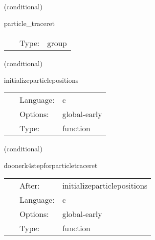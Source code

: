 \vspace{5mm}

   (conditional) 

\hspace{5mm} particle\_traceret 

\hspace{5mm}{\it particle traceret subroutines } 


\hspace{5mm}

 \begin{tabular*}{160mm}{cll} 
~ & Type:  & group \\ 
\end{tabular*} 


\vspace{5mm}

   (conditional) 

\hspace{5mm} initializeparticlepositions 

\hspace{5mm}{\it initialize particle positions } 


\hspace{5mm}

 \begin{tabular*}{160mm}{cll} 
~ & Language:  & c \\ 
~ & Options:  & global-early \\ 
~ & Type:  & function \\ 
\end{tabular*} 


\vspace{5mm}

   (conditional) 

\hspace{5mm} doonerk4stepforparticletraceret 

\hspace{5mm}{\it do one rk4 step for particle traceret } 


\hspace{5mm}

 \begin{tabular*}{160mm}{cll} 
~ & After:  & initializeparticlepositions \\ 
~ & Language:  & c \\ 
~ & Options:  & global-early \\ 
~ & Type:  & function \\ 
\end{tabular*} 



